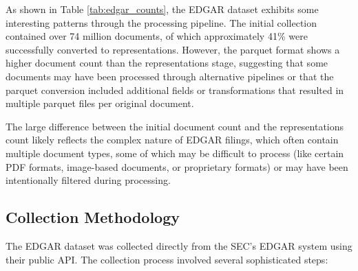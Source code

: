 As shown in Table \ref{tab:edgar_counts}, the EDGAR dataset exhibits some interesting patterns through the processing pipeline. The initial collection contained over 74 million documents, of which approximately 41\% were successfully converted to representations. However, the parquet format shows a higher document count than the representations stage, suggesting that some documents may have been processed through alternative pipelines or that the parquet conversion included additional fields or transformations that resulted in multiple parquet files per original document.

The large difference between the initial document count and the representations count likely reflects the complex nature of EDGAR filings, which often contain multiple document types, some of which may be difficult to process (like certain PDF formats, image-based documents, or proprietary formats) or may have been intentionally filtered during processing.

\subsection{Collection Methodology}

The EDGAR dataset was collected directly from the SEC's EDGAR system using their public API. The collection process involved several sophisticated steps:

